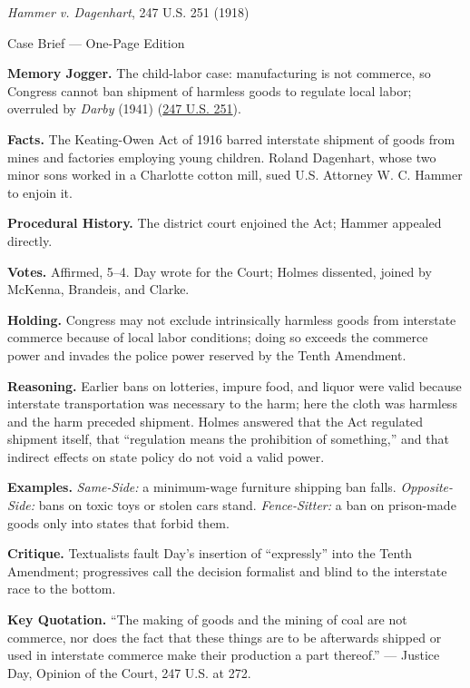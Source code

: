 \documentclass[12pt]{article}
\begin{document}
\begin{center}
{\Large \textit{Hammer v. Dagenhart}, 247 U.S. 251 (1918)\par}
\vspace{0.3em}
{\normalsize Case Brief --- One-Page Edition\par}
\end{center}

\textbf{Memory Jogger.} The child-labor case: manufacturing is not commerce, so Congress cannot ban shipment of harmless goods to regulate local labor; overruled by \textit{Darby} (1941) (\href{https://supreme.justia.com/cases/federal/us/247/251/}{247 U.S. 251}).

\textbf{Facts.} The Keating-Owen Act of 1916 barred interstate shipment of goods from mines and factories employing young children. Roland Dagenhart, whose two minor sons worked in a Charlotte cotton mill, sued U.S. Attorney W. C. Hammer to enjoin it.

\textbf{Procedural History.} The district court enjoined the Act; Hammer appealed directly.

\textbf{Votes.} Affirmed, 5--4. Day wrote for the Court; Holmes dissented, joined by McKenna, Brandeis, and Clarke.

\textbf{Holding.} Congress may not exclude intrinsically harmless goods from interstate commerce because of local labor conditions; doing so exceeds the commerce power and invades the police power reserved by the Tenth Amendment.

\textbf{Reasoning.} Earlier bans on lotteries, impure food, and liquor were valid because interstate transportation was necessary to the harm; here the cloth was harmless and the harm preceded shipment. Holmes answered that the Act regulated shipment itself, that ``regulation means the prohibition of something,'' and that indirect effects on state policy do not void a valid power.

\textbf{Examples.} \emph{Same-Side:} a minimum-wage furniture shipping ban falls. \emph{Opposite-Side:} bans on toxic toys or stolen cars stand. \emph{Fence-Sitter:} a ban on prison-made goods only into states that forbid them.

\textbf{Critique.} Textualists fault Day's insertion of ``expressly'' into the Tenth Amendment; progressives call the decision formalist and blind to the interstate race to the bottom.

\textbf{Key Quotation.} ``The making of goods and the mining of coal are not commerce, nor does the fact that these things are to be afterwards shipped or used in interstate commerce make their production a part thereof.'' --- Justice Day, Opinion of the Court, 247 U.S. at 272.
\end{document}
